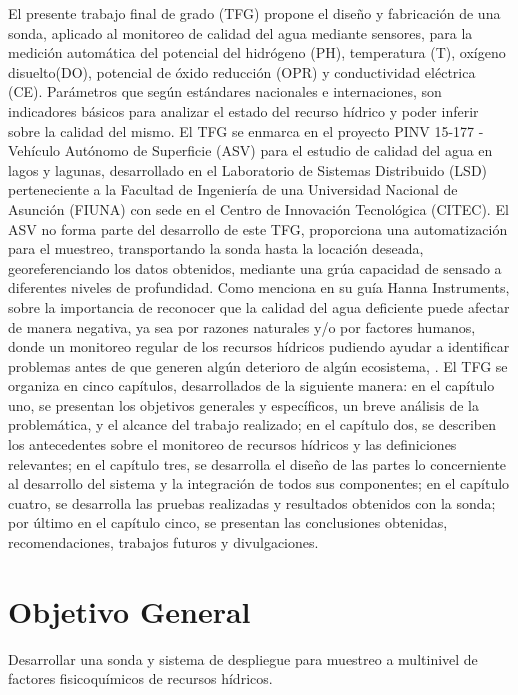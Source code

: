El presente trabajo final de grado (TFG) propone el diseño y fabricación de una sonda, aplicado al monitoreo de calidad del agua mediante sensores, para la medición automática del potencial del hidrógeno (PH), temperatura (T), oxígeno disuelto(DO), potencial de \'oxido reducción (OPR) y conductividad eléctrica (CE). 
Par\'ametros que seg\'un estándares nacionales e internaciones, son indicadores básicos para analizar el estado del recurso hídrico y poder inferir sobre la calidad del mismo.  
El TFG se enmarca en el proyecto PINV 15-177 - Vehículo Autónomo de Superficie (ASV) para el estudio de calidad del agua en lagos y lagunas, desarrollado en el Laboratorio de Sistemas Distribuido (LSD) perteneciente a la Facultad de Ingeniería de una Universidad Nacional de Asunción (FIUNA) con sede en el Centro de Innovación Tecnológica (CITEC). 
El ASV no forma parte del desarrollo de este TFG, proporciona una automatización para el muestreo, transportando la sonda hasta la locación deseada, georeferenciando los datos obtenidos, mediante una gr\'ua  capacidad de sensado a diferentes niveles de profundidad. 
Como menciona en su gu\'ia Hanna Instruments, sobre la importancia de reconocer que la calidad del agua deficiente puede afectar de manera negativa,  ya sea por razones naturales y/o por factores humanos, donde un monitoreo regular de los recursos hídricos pudiendo ayudar a identificar problemas antes de que generen algún deterioro de algún ecosistema, \cite{guiaHANNA}.
El TFG  se organiza en cinco capítulos, desarrollados de la siguiente manera: 
en el capítulo uno, se presentan los objetivos generales y específicos,  un breve an\'alisis de la problemática, y el alcance del trabajo realizado;
en el capítulo dos, se describen los antecedentes sobre el monitoreo de recursos hídricos y las definiciones relevantes;
en el capítulo tres, se desarrolla el diseño de las partes lo concerniente al desarrollo del sistema y la integración de todos sus componentes;   
en el cap\'itulo cuatro, se desarrolla las pruebas realizadas y resultados obtenidos con la sonda;
por último en el capítulo cinco,  se presentan las conclusiones obtenidas, recomendaciones, trabajos futuros y divulgaciones.

\section{Objetivo General}
Desarrollar una sonda y sistema de despliegue para muestreo a multinivel de factores fisicoquímicos de recursos hídricos.

